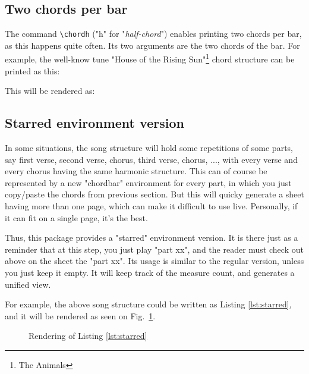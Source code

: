 \documentclass[11pt]{article}
\begin{document}
\subsection{Two chords per bar} 
The command \verb|\chordh| ("h" for "{\em half-chord}") enables printing two chords per bar, as this happens quite often.
Its two arguments are the two chords of the bar.
For example, the well-know tune "House of the Rising Sun"\footnote{The Animals} chord structure can be printed as this:



This will be rendered as:
\def\chordFontSize{\Large\bfseries}
\resetchordbars
\countbarsNo



\subsection{Starred environment version}

In some situations, the song structure will hold some repetitions of some parts, say first verse, second verse, chorus, third verse, chorus, ..., with every verse and every chorus having the same harmonic structure.
This can of course be represented by a new "chordbar" environment for every part, in which you just copy/paste the chords from previous section.
But this will quicky generate a sheet having more than one page, which can make it difficult to use live.
Personally, if it can fit on a single page, it's the best.

Thus, this package provides a "starred" environment version.
It is there just as a reminder that at this step, you just play "part xx", and the reader must check out above on the sheet the "part xx".
Its usage is similar to the regular version, unless you just keep it empty.
It will keep track of the measure count, and generates a unified view. 



For example, the above song structure could be written as Listing \ref{lst:starred}, and it will be rendered as seen on Fig.~\ref{fig:starred}.
\def\chordFontSize{\Large\bfseries}
\resetchordbars
\countbarsYes
\begin{figure}
\begin{mdframed}

\end{mdframed}
\caption{Rendering of Listing \ref{lst:starred}}
\label{fig:starred}
\end{figure}
\end{document}
